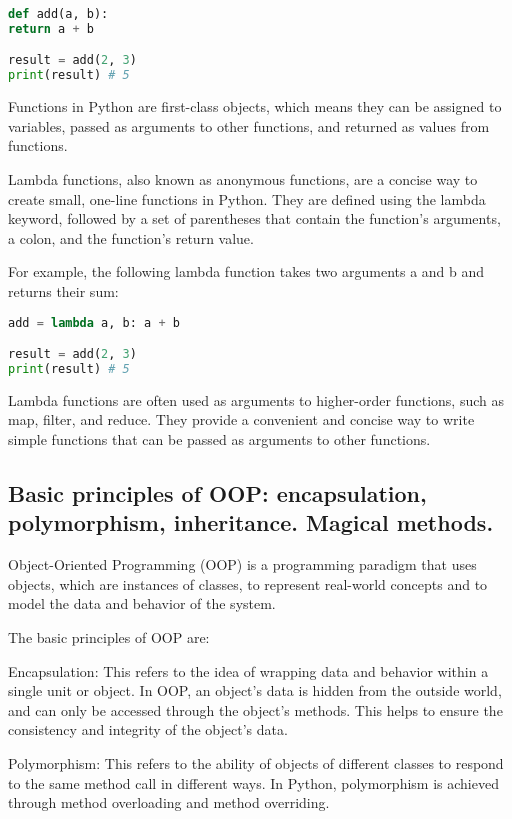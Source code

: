 \documentclass[12pt, a4paper, oneside]{article}
\begin{document}
\begin{lstlisting}[language=Python, frame=single]
def add(a, b):
return a + b

result = add(2, 3)
print(result) # 5
\end{lstlisting}

Functions in Python are first-class objects, which means they can be assigned to variables, passed as arguments to other functions, and returned as values from functions.

Lambda functions, also known as anonymous functions, are a concise way to create small, one-line functions in Python. They are defined using the lambda keyword, followed by a set of parentheses that contain the function's arguments, a colon, and the function's return value.

For example, the following lambda function takes two arguments a and b and returns their sum:

\begin{lstlisting}[language=Python, frame=single]
add = lambda a, b: a + b

result = add(2, 3)
print(result) # 5
\end{lstlisting}

Lambda functions are often used as arguments to higher-order functions, such as map, filter, and reduce. They provide a convenient and concise way to write simple functions that can be passed as arguments to other functions.

\subsection{ Basic principles of OOP: encapsulation, polymorphism, inheritance. Magical methods. }
Object-Oriented Programming (OOP) is a programming paradigm that uses objects, which are instances of classes, to represent real-world concepts and to model the data and behavior of the system.

The basic principles of OOP are:

Encapsulation: This refers to the idea of wrapping data and behavior within a single unit or object. In OOP, an object's data is hidden from the outside world, and can only be accessed through the object's methods. This helps to ensure the consistency and integrity of the object's data.

Polymorphism: This refers to the ability of objects of different classes to respond to the same method call in different ways. In Python, polymorphism is achieved through method overloading and method overriding.
\end{document}

